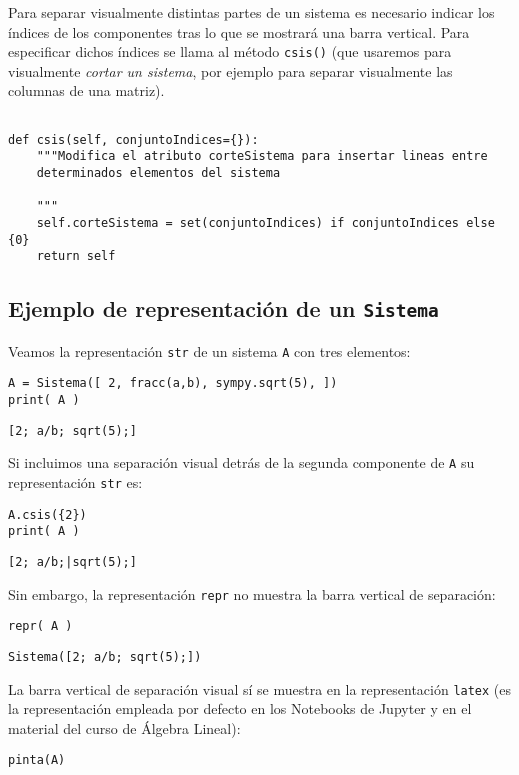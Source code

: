 \documentclass[11pt]{report}
\begin{document}
Para separar visualmente distintas partes de un sistema es necesario
indicar los índices de los componentes tras lo que se mostrará una
barra vertical. Para especificar dichos índices se llama al método
\texttt{csis()} (que usaremos para visualmente \emph{cortar un sistema}, por
ejemplo para separar visualmente las columnas de una matriz).
\begin{verbatim}

def csis(self, conjuntoIndices={}):
    """Modifica el atributo corteSistema para insertar lineas entre
    determinados elementos del sistema

    """
    self.corteSistema = set(conjuntoIndices) if conjuntoIndices else {0}
    return self

\end{verbatim}

\subsection{Ejemplo de representación de un \texttt{Sistema}}
\label{sec:org1c39bf1}
Veamos la representación \texttt{str} de un sistema \texttt{A} con tres elementos:
\begin{verbatim}
A = Sistema([ 2, fracc(a,b), sympy.sqrt(5), ])
print( A )
\end{verbatim}

\texttt{[2; a/b; sqrt(5);]}

Si incluimos una separación visual detrás de la segunda componente de
\texttt{A} su representación \texttt{str} es:
\begin{verbatim}
A.csis({2})
print( A )
\end{verbatim}

\texttt{[2; a/b;|sqrt(5);]}

Sin embargo, la representación \texttt{repr} no muestra la barra vertical de
separación:
\begin{verbatim}
repr( A )
\end{verbatim}

\texttt{Sistema([2; a/b; sqrt(5);])}

La barra vertical de separación visual sí se muestra en la
representación \texttt{latex} (es la representación empleada por defecto en
los Notebooks de Jupyter y en el material del curso de Álgebra
Lineal):
\begin{verbatim}
pinta(A)
\end{verbatim}
\end{document}
